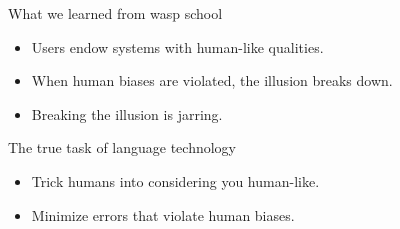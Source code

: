 \documentclass[xcolor={usenames,svgnames,x11names,dvipsnames,table}]{beamer}
\begin{document}
\begin{frame}{What we learned from wasp school}
    \begin{itemize}
        \item Users endow systems with human-like qualities.
        \item When human biases are violated, the illusion breaks down.
        \item Breaking the illusion is jarring.
    \end{itemize}

    \begin{block}{The true task of language technology}
        \begin{itemize}
            \item Trick humans into considering you human-like.
            \item Minimize errors that violate human biases.
        \end{itemize}
    \end{block}
\end{frame}
\end{document}
